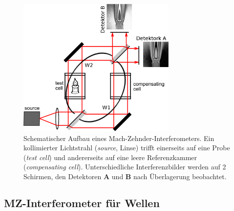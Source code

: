 \documentclass[numbers=noenddot,a4paper,notitlepage,twoside,BCOR15mm]{scrartcl}
\newcommand{\tilt}[1]{\textit{#1}}
\newcommand{\fett}[1]{\textbf{#1}}
\begin{document}
			\begin{figure}[H]
				\centering
				\includegraphics[width=0.7\textwidth]{Mach_Zehnder_interferometer.png}
				\caption{Schematischer Aufbau eines Mach-Zehnder-Interferometers. Ein kollimierter Lichtstrahl (\tilt{source}, Linse) trifft einerseits auf eine Probe (\tilt{test cell}) und andererseits auf eine leere Referenzkammer (\tilt{compensating cell}). Unterschiedliche Interferenzbilder werden auf 2 Schirmen, den Detektoren \fett{A} und \fett{B} nach Überlagerung beobachtet. \cite{WikiMZInt}}
				\label{img:aufbau}
			\end{figure}

\clearpage
			\subsection{MZ-Interferometer für Wellen}
\end{document}
